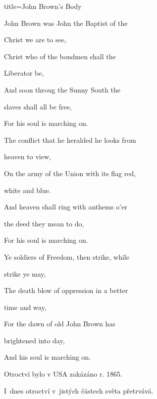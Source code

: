 \begin{song}{title=\predtitle \centering John Brown's Body \\\large  }
{\begin{centerjustified}
\begin{varwidth}[t]{0.5\textwidth}



\end{varwidth}\begin{varwidth}[t]{0.55\textwidth}\setlength{\parindent}{\pindent}
\vspace*{0.03cm}


\sloka
John Brown was John the Baptist of the

Christ we are to see,

Christ who of the bondmen shall the

Liberator be,

And soon throug the Sunny South the

slaves shall all be free,

For his soul is marching on.



\sloka
The conflict that he heralded he looks from

heaven to view,

On the army of the Union with its flag red,

white and blue.

And heaven shall ring with anthems o’er

the deed they mean to do,

For his soul is marching on.


\sloka
Ye soldiers of Freedom, then strike, while

strike ye may,

The death blow of oppression in a better

time and way,

For the dawn of old John Brown has

brightened into day,

And his soul is marching on.


\hrulefill

\vspace*{.1cm}

\begin{varwidth}{.5\textwidth}
Otroctví bylo v USA zakázáno r. 1865.

I~dnes otroctví v~jistých částech světa přetrvává.


\end{varwidth}
\end{varwidth}
\end{centerjustified}}
\end{song}
